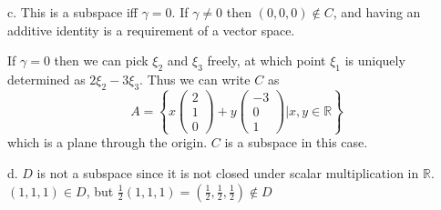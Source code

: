 \documentclass{article}
\newcommand{\chapternumber}{2}
\newenvironment{QandA}{\begin{enumerate}[label=\chapternumber.\arabic*]\bfseries\boldmath}
	{\end{enumerate}}
\newenvironment{answered}{\par\bigskip\normalfont\unboldmath}{}
\begin{document}
\begin{QandA}
\begin{answered}
			c. This is a subspace iff $\gamma=0$. If $\gamma\neq0$ then $(0,0,0)\notin C$, and having an additive identity is a requirement of a vector space.
			
			If $\gamma=0$ then we can pick $\xi_2$ and $\xi_3$ freely, at which point $\xi_1$ is uniquely determined as $2\xi_2-3\xi_3$. Thus we can write $C$ as
			\[A = \left\{
			x\begin{pmatrix}
				2 \\ 1 \\ 0
			\end{pmatrix}
			+			
			y\begin{pmatrix}
				-3 \\ 0 \\ 1
			\end{pmatrix}
			|x,y\in\mathbb{R}
			\right\}
			\]
			which is a plane through the origin. $C$ is a subspace in this case.
			
			d. $D$ is not a subspace since it is not closed under scalar multiplication in $\mathbb{R}$. $(1,1,1)\in D$, but $\frac{1}{2}(1,1,1)=(\frac{1}{2},\frac{1}{2},\frac{1}{2})\notin D$
		\end{answered}
	\end{QandA}
\end{document}
